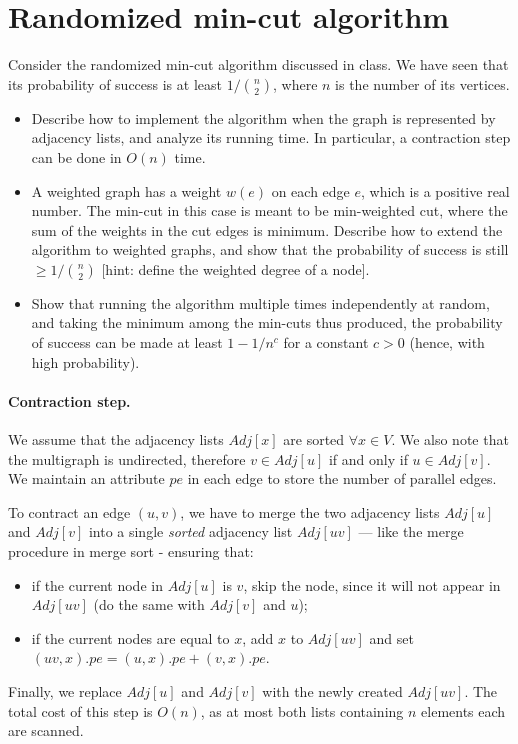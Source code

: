 \section{Randomized min-cut algorithm}

Consider the randomized min-cut algorithm discussed in class. We have seen that its probability of success is at least $1/{n \choose 2}$, where $n$ is the number of its vertices.
\begin{itemize}
  \item Describe how to implement the algorithm when the graph is represented by adjacency lists, and analyze its running time. In particular, a contraction step can be done in $O(n)$ time.
  \item A weighted graph has a weight $w(e)$ on each edge $e$, which is a positive real number. The min-cut in this case is meant to be min-weighted cut, where the sum of the weights in the cut edges is minimum. Describe how to extend the algorithm to weighted graphs, and show that the probability of success is still $\geq 1/{n \choose 2}$ [hint: define the weighted degree of a node].
  \item Show that running the algorithm multiple times independently at random, and taking the minimum among the min-cuts thus produced, the probability of success can be made at least $1 - 1/n^c$ for a constant $c > 0$ (hence, with high probability).
\end{itemize}

\vspace{0.5cm}
\paragraph{Contraction step.} We assume that the adjacency lists $Adj[x]$ are sorted $\forall x \in V$. We also note that the multigraph is undirected, therefore $v\in Adj[u]$ if and only if $u\in Adj[v]$. We maintain an attribute $pe$ in each edge to store the number of parallel edges.

To contract an edge $(u, v)$, we have to merge the two adjacency lists $Adj[u]$ and $Adj[v]$ into a single \emph{sorted} adjacency list $Adj[uv]$ --- like the merge procedure in merge sort - ensuring that:
\begin{itemize}
  \item if the current node in $Adj[u]$ is $v$, skip the node, since it will not appear in $Adj[uv]$ (do the same with $Adj[v]$ and $u$);
  \item if the current nodes are equal to $x$, add $x$ to $Adj[uv]$ and set $(uv, x).pe = (u,x).pe + (v,x).pe$.
\end{itemize}
Finally, we replace $Adj[u]$ and $Adj[v]$ with the newly created $Adj[uv]$. The total cost of this step is $O(n)$, as at most both lists containing $n$ elements each are scanned.

